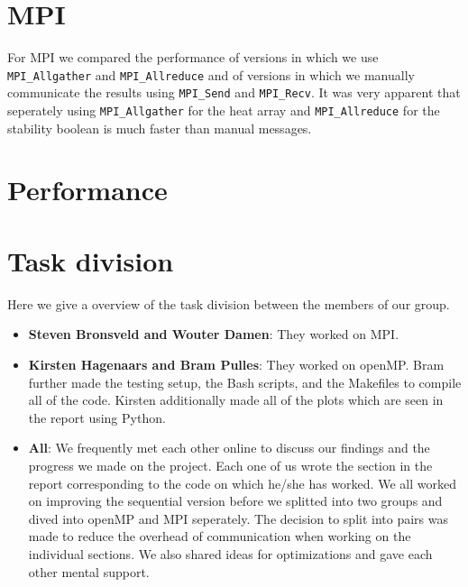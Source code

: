\documentclass[a4paper]{article}
\begin{document}
\section{MPI}
For MPI we compared the performance of versions in which  we use \texttt{MPI\_Allgather}
and \texttt{MPI\_Allreduce} and of versions in which we manually communicate the results using \texttt{MPI\_Send} and \texttt{MPI\_Recv}. It was very apparent that seperately using \texttt{MPI\_Allgather} for the heat array and \texttt{MPI\_Allreduce} for the stability boolean is much faster than manual messages.

\section{Performance}

\section{Task division}
Here we give a overview of the task division between the members of our group.
\begin{itemize}
    \item \textbf{Steven Bronsveld and Wouter Damen}: They worked on MPI.
    \item \textbf{Kirsten Hagenaars and Bram Pulles}: They worked on openMP. Bram further made the testing setup, the Bash scripts, and the Makefiles to compile all of the code. Kirsten additionally made all of the plots which are seen in the report using Python.
    \item \textbf{All}: We frequently met each other online to discuss our findings and the progress we made on the project. Each one of us wrote the section in the report corresponding to the code on which he/she has worked. We all worked on improving the sequential version before we splitted into two groups and dived into openMP and MPI seperately. The decision to split into pairs was made to reduce the overhead of communication when working on the individual sections. We also shared ideas for optimizations and gave each other mental support.
\end{itemize}
\end{document}
